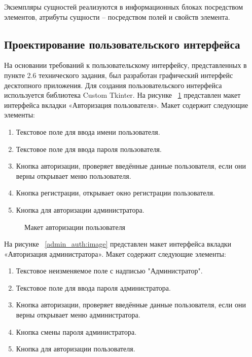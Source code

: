 Экземпляры сущностей реализуются в информационных блоках посредством элементов, атрибуты сущности – посредством полей и свойств элемента. 

\subsection{Проектирование пользовательского интерфейса}

На основании требований к пользовательскому интерфейсу, представленных в пункте 2.6 технического задания, был разработан графический интерфейс десктопного приложения. Для создания пользовательского
интерфейса используется библиотека Custom Tkinter.
На рисунке ~\ref{user_auth:image} представлен макет интерфейса вкладки «Авторизация пользователя». Макет содержит следующие элементы:
\begin{enumerate}
	\item Текстовое поле для ввода имени пользователя.
	\item Текстовое поле для ввода пароля пользователя.
	\item Кнопка авторизации, проверяет введённые данные пользователя, если они верны открывает меню пользователя.
	\item Кнопка регистрации, открывает окно регистрации пользователя.
	\item Кнопка для авторизации администратора. 
\end{enumerate}

\begin{figure}[H]
	\caption{Макет авторизации пользователя}
	\label{user_auth:image}
\end{figure}

На рисунке ~\ref{admin_auth:image} представлен макет интерфейса вкладки «Авторизация администратора». Макет содержит следующие элементы:
\begin{enumerate}
	\item Текстовое неизменяемое поле с надписью "Администратор".
	\item Текстовое поле для ввода пароля администратора.
	\item Кнопка авторизации, проверяет введённые данные пользователя, если они верны открывает меню администратора.
	\item Кнопка смены пароля администратора.
	\item Кнопка для авторизации пользователя. 
\end{enumerate}

